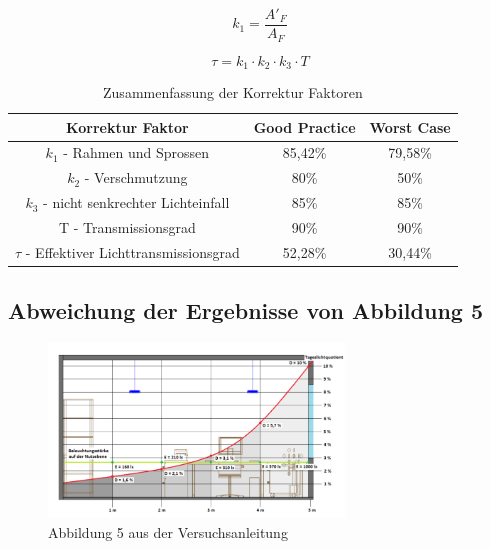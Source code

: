 \begin{equation}
    k_1 = \frac{A'_F}{A_F}
    \label{eq:230624_k1}
\end{equation}

\begin{equation}
    \tau = k_1 \cdot k_2 \cdot k_3 \cdot T
    \label{eq:230624_Lichttransmissionsgrad}
\end{equation}


\begin{table}[H]
    \caption{Zusammenfassung der Korrektur Faktoren}
    \centering
    \begin{tabular}{|c|c|c|}
    \hline
    \rowcolor[HTML]{70AD47} 
    Korrektur Faktor                                & Good Practice & Worst Case \\\hline
    \rowcolor[HTML]{CFE5A8} 
    $k_1$ - Rahmen und Sprossen                     & 85,42\%       & 79,58\%    \\\hline
    \rowcolor[HTML]{A9D08E} 
    $k_2$ - Verschmutzung                           & 80\%          & 50\%       \\\hline
    \rowcolor[HTML]{CFE5A8} 
    $k_3$ - nicht senkrechter Lichteinfall          & 85\%          & 85\%       \\\hline
    \rowcolor[HTML]{A9D08E} 
    T - Transmissionsgrad                           & 90\%          & 90\%       \\\hline
    \rowcolor[HTML]{CFE5A8} 
    $\tau$ - Effektiver Lichttransmissionsgrad      & 52,28\%       & 30,44\%   \\\hline
    \end{tabular}
    \label{tab:230426_Korrektur-Faktoren}
\end{table}

\subsection{Abweichung der Ergebnisse von Abbildung 5}

\begin{figure}[H]
    \centering
    \includegraphics[width=0.7\textwidth]{Abbildungen/abb5.png}
    \caption{Abbildung 5 aus der Versuchsanleitung }
    \label{fig:abb5}
\end{figure}

